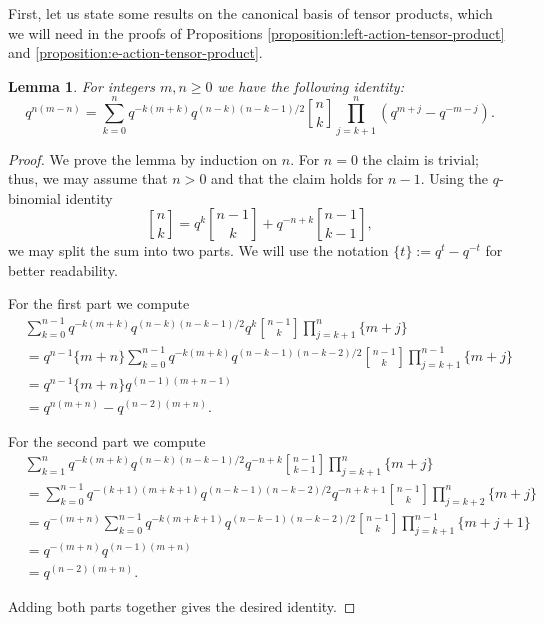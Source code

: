 \documentclass[final]{amsart}
\theoremstyle{plain}
\newtheorem{lemma}[corollary]{Lemma}
\theoremstyle{definition}
\newcommand{\qbinom}{\genfrac{[}{]}{0pt}{}}
\begin{document}
First, let us state some results on the canonical basis of tensor products, which we will need in the proofs of Propositions \ref{proposition:left-action-tensor-product} and \ref{proposition:e-action-tensor-product}.
\begin{lemma}
    \label{lemma:q-power-identity}
    For integers $m, n \ge 0$ we have the following identity:
    \[
        q^{n(m-n)} = \sum_{k=0}^n q^{-k(m+k)} q^{(n-k)(n-k-1)/2} \qbinom{n}{k} \prod_{j=k+1}^n (q^{m+j} - q^{-m-j}).
    \]
\end{lemma}
\begin{proof}
    We prove the lemma by induction on $n$.
    For $n = 0$ the claim is trivial; thus, we may assume that $n > 0$ and that the claim holds for $n-1$.
    Using the $q$-binomial identity
    \[
        \qbinom{n}{k} = q^k \qbinom{n-1}{k} + q^{-n+k} \qbinom{n-1}{k-1},
    \]
    we may split the sum into two parts.
    We will use the notation $\{t\} := q^t - q^{-t}$ for better readability.

    For the first part we compute
    \begin{align*}
        & \sum_{k=0}^{n-1} q^{-k(m+k)} q^{(n-k)(n-k-1)/2} q^k \qbinom{n-1}{k} \prod_{j=k+1}^n \{m+j\} \\
        &= q^{n-1} \{m+n\} \sum_{k=0}^{n-1} q^{-k(m+k)} q^{(n-k-1)(n-k-2)/2} \qbinom{n-1}{k} \prod_{j=k+1}^{n-1} \{m+j\} \\
        &= q^{n-1} \{m+n\} q^{(n-1)(m+n-1)} \\
        &= q^{n(m+n)} - q^{(n-2)(m+n)}.
    \end{align*}

    For the second part we compute
    \begin{align*}
        & \sum_{k=1}^n q^{-k(m+k)} q^{(n-k)(n-k-1)/2} q^{-n+k} \qbinom{n-1}{k-1} \prod_{j=k+1}^n \{m+j\} \\
        &= \sum_{k=0}^{n-1} q^{-(k+1)(m+k+1)} q^{(n-k-1)(n-k-2)/2} q^{-n+k+1} \qbinom{n-1}{k} \prod_{j=k+2}^n \{m+j\} \\
        &= q^{-(m+n)} \sum_{k=0}^{n-1} q^{-k(m+k+1)} q^{(n-k-1)(n-k-2)/2} \qbinom{n-1}{k} \prod_{j=k+1}^{n-1} \{m+j+1\} \\
        &= q^{-(m+n)} q^{(n-1)(m+n)} \\
        &= q^{(n-2)(m+n)}.
    \end{align*}

    Adding both parts together gives the desired identity.
\end{proof}
\end{document}
